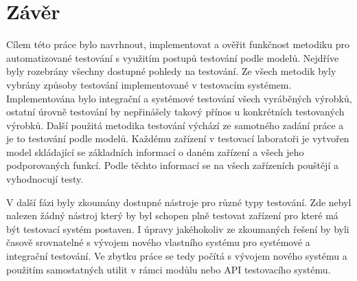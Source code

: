 \chapter{Závěr}
Cílem této práce bylo navrhnout, implementovat a ověřit funkčnost metodiku pro automatizované testování s využitím postupů testování podle modelů. Nejdříve byly rozebrány všechny dostupné pohledy na testování. Ze všech metodik byly vybrány způsoby testování implementované v testovacím systémem. Implementována bylo integrační a systémové testování všech vyráběných výrobků, ostatní úrovně testování by nepřinášely takový přínos u konkrétních testovaných výrobků. Další použitá metodika testování výchází ze samotného zadání práce a je to testování podle modelů. Každému zařízení v testovací laboratoři je vytvořen model skládající se základních informací o daném zařízení a všech jeho podporovaných funkcí. Podle těchto informací se na všech zařízeních pouštějí a vyhodnocují testy.

V další fázi byly zkoumány dostupné nástroje pro různé typy testování. Zde nebyl nalezen žádný nástroj který by byl schopen plně testovat zařízení pro které má být testovací systém postaven. I úpravy jakéhokoliv ze zkoumaných řešení by byli časově srovnatelné s vývojem nového vlastního systému pro systémové a integrační testování. Ve zbytku práce se tedy počítá s vývojem nového systému a použitím samostatných utilit v rámci modůlu nebo API testovacího systému.



\endinput
